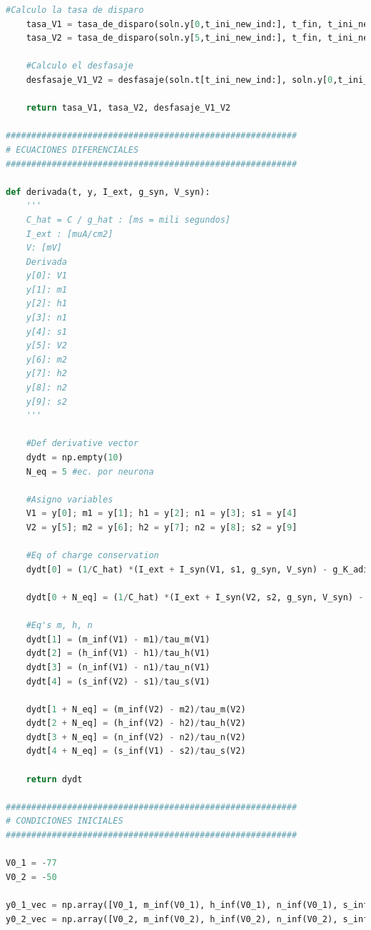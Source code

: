 \documentclass[aps,prb,twocolumn,superscriptaddress,floatfix,longbibliography]{revtex4-2}
\begin{document}
\begin{lstlisting}[language=Python]
    #Calculo la tasa de disparo
    tasa_V1 = tasa_de_disparo(soln.y[0,t_ini_new_ind:], t_fin, t_ini_new)
    tasa_V2 = tasa_de_disparo(soln.y[5,t_ini_new_ind:], t_fin, t_ini_new)

    #Calculo el desfasaje
    desfasaje_V1_V2 = desfasaje(soln.t[t_ini_new_ind:], soln.y[0,t_ini_new_ind:], soln.y[5,t_ini_new_ind:])

    return tasa_V1, tasa_V2, desfasaje_V1_V2

#########################################################
# ECUACIONES DIFERENCIALES
#########################################################

def derivada(t, y, I_ext, g_syn, V_syn):
    '''
    C_hat = C / g_hat : [ms = mili segundos]
    I_ext : [muA/cm2]
    V: [mV]
    Derivada
    y[0]: V1
    y[1]: m1
    y[2]: h1
    y[3]: n1
    y[4]: s1
    y[5]: V2
    y[6]: m2
    y[7]: h2
    y[8]: n2
    y[9]: s2
    '''

    #Def derivative vector
    dydt = np.empty(10)
    N_eq = 5 #ec. por neurona

    #Asigno variables
    V1 = y[0]; m1 = y[1]; h1 = y[2]; n1 = y[3]; s1 = y[4]
    V2 = y[5]; m2 = y[6]; h2 = y[7]; n2 = y[8]; s2 = y[9]

    #Eq of charge conservation
    dydt[0] = (1/C_hat) *(I_ext + I_syn(V1, s1, g_syn, V_syn) - g_K_adim*n1**4*(V1 - V_K) - g_Na_adim*m1**3*h1*(V1 - V_Na) - g_L_adim*(V1 - V_L))

    dydt[0 + N_eq] = (1/C_hat) *(I_ext + I_syn(V2, s2, g_syn, V_syn) - g_K_adim*n2**4*(V2 - V_K) - g_Na_adim*m2**3*h2*(V2 - V_Na) - g_L_adim*(V2 - V_L))

    #Eq's m, h, n
    dydt[1] = (m_inf(V1) - m1)/tau_m(V1)
    dydt[2] = (h_inf(V1) - h1)/tau_h(V1)
    dydt[3] = (n_inf(V1) - n1)/tau_n(V1)
    dydt[4] = (s_inf(V2) - s1)/tau_s(V1)

    dydt[1 + N_eq] = (m_inf(V2) - m2)/tau_m(V2)
    dydt[2 + N_eq] = (h_inf(V2) - h2)/tau_h(V2)
    dydt[3 + N_eq] = (n_inf(V2) - n2)/tau_n(V2)
    dydt[4 + N_eq] = (s_inf(V1) - s2)/tau_s(V2)

    return dydt

#########################################################
# CONDICIONES INICIALES
#########################################################

V0_1 = -77
V0_2 = -50

y0_1_vec = np.array([V0_1, m_inf(V0_1), h_inf(V0_1), n_inf(V0_1), s_inf(V0_1)])
y0_2_vec = np.array([V0_2, m_inf(V0_2), h_inf(V0_2), n_inf(V0_2), s_inf(V0_2)])


\end{lstlisting}
\end{document}

